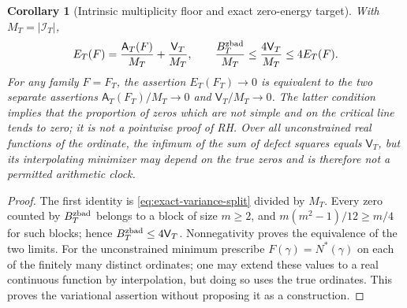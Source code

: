 \documentclass[11pt,reqno]{amsart}
\numberwithin{equation}{section}
\newtheorem{corollary}[theorem]{Corollary}
\begin{document}
\begin{corollary}[Intrinsic multiplicity floor and exact zero-energy target]
\label{cor:intrinsic-floor}
With $M_T=|\mathcal I_T|$,
\begin{equation}\label{eq:intrinsic-floor}
  E_T(F)=\frac{\mathsf A_T(F)}{M_T}
           +\frac{\mathsf V_T}{M_T},\qquad
  \frac{B_T^{\rm zbad}}{M_T}\le\frac{4\mathsf V_T}{M_T}
                                \le4E_T(F).
\end{equation}
For any family $F=F_T$, the assertion $E_T(F_T)\to0$ is
\emph{equivalent} to the two separate assertions
$\mathsf A_T(F_T)/M_T\to0$ and $\mathsf V_T/M_T\to0$.
The latter condition implies that the proportion of zeros which are
not simple and on the critical line tends to zero; it is not a
pointwise proof of RH.  Over all unconstrained real functions of
the ordinate, the infimum of the sum of defect squares equals
$\mathsf V_T$, but its interpolating minimizer may depend on the
true zeros and is therefore \emph{not} a permitted arithmetic clock.
\end{corollary}
\begin{proof}
The first identity is \eqref{eq:exact-variance-split} divided by
$M_T$.  Every zero counted by $B_T^{\rm zbad}$ belongs to a block
of size $m\ge2$, and
$m(m^2-1)/12\ge m/4$ for such blocks;
hence $B_T^{\rm zbad}\le4\mathsf V_T$.
Nonnegativity proves the equivalence of the two limits.
For the unconstrained minimum prescribe $F(\gamma)=N^*(\gamma)$
on each of the finitely many distinct ordinates; one may extend
these values to a real continuous function by interpolation,
but doing so uses the true ordinates.  This proves the variational
assertion without proposing it as a construction.
\end{proof}
\end{document}
